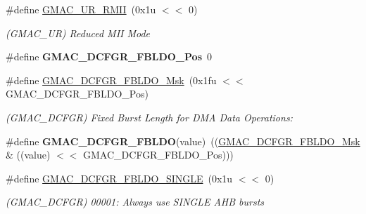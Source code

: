\begin{DoxyCompactItemize}
\mbox{\label{group__SAME70__GMAC_ga2152ef6b6505d61682c1c64bc68257ac}} 
\#define \mbox{\hyperlink{group__SAME70__GMAC_ga2152ef6b6505d61682c1c64bc68257ac}{G\+M\+A\+C\+\_\+\+U\+R\+\_\+\+R\+M\+II}}~(0x1u $<$$<$ 0)
\begin{DoxyCompactList}\small\item\em (G\+M\+A\+C\+\_\+\+UR) Reduced M\+II Mode \end{DoxyCompactList}\item 
\mbox{\label{group__SAME70__GMAC_ga0e1119ca667d6f05b1300dc485e9d192}} 
\#define {\bfseries G\+M\+A\+C\+\_\+\+D\+C\+F\+G\+R\+\_\+\+F\+B\+L\+D\+O\+\_\+\+Pos}~0
\item 
\mbox{\label{group__SAME70__GMAC_gabb45c97d81990518102331c52a66110a}} 
\#define \mbox{\hyperlink{group__SAME70__GMAC_gabb45c97d81990518102331c52a66110a}{G\+M\+A\+C\+\_\+\+D\+C\+F\+G\+R\+\_\+\+F\+B\+L\+D\+O\+\_\+\+Msk}}~(0x1fu $<$$<$ G\+M\+A\+C\+\_\+\+D\+C\+F\+G\+R\+\_\+\+F\+B\+L\+D\+O\+\_\+\+Pos)
\begin{DoxyCompactList}\small\item\em (G\+M\+A\+C\+\_\+\+D\+C\+F\+GR) Fixed Burst Length for D\+MA Data Operations\+: \end{DoxyCompactList}\item 
\mbox{\label{group__SAME70__GMAC_ga19842f6820531899f6d2013acced0d33}} 
\#define {\bfseries G\+M\+A\+C\+\_\+\+D\+C\+F\+G\+R\+\_\+\+F\+B\+L\+DO}(value)~((\mbox{\hyperlink{group__SAMV71__GMAC_gabb45c97d81990518102331c52a66110a}{G\+M\+A\+C\+\_\+\+D\+C\+F\+G\+R\+\_\+\+F\+B\+L\+D\+O\+\_\+\+Msk}} \& ((value) $<$$<$ G\+M\+A\+C\+\_\+\+D\+C\+F\+G\+R\+\_\+\+F\+B\+L\+D\+O\+\_\+\+Pos)))
\item 
\mbox{\label{group__SAME70__GMAC_ga010e4766787754396b3ad8babdf3a376}} 
\#define \mbox{\hyperlink{group__SAME70__GMAC_ga010e4766787754396b3ad8babdf3a376}{G\+M\+A\+C\+\_\+\+D\+C\+F\+G\+R\+\_\+\+F\+B\+L\+D\+O\+\_\+\+S\+I\+N\+G\+LE}}~(0x1u $<$$<$ 0)
\begin{DoxyCompactList}\small\item\em (G\+M\+A\+C\+\_\+\+D\+C\+F\+GR) 00001\+: Always use S\+I\+N\+G\+LE A\+HB bursts \end{DoxyCompactList}\item 

\end{DoxyCompactItemize}

